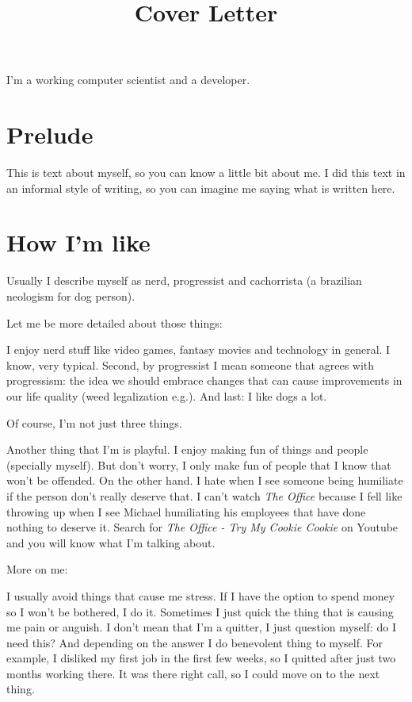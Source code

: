 \documentclass[11pt,a4paper,sans]{moderncv}
\title{Cover Letter}
\begin{document}
\makecvtitle %
I'm a working computer scientist and a developer.

\section{Prelude}
This is text about myself, so you can know a little bit about me.
I did this text in an informal style of writing, so you can imagine me saying what is written here.

\section{How I'm like}
Usually I describe myself as nerd, progressist and cachorrista (a brazilian neologism for dog person).

Let me be more detailed about those things:

I enjoy nerd stuff like video games, fantasy movies and technology in general.
I know, very typical.
Second, by progressist I mean someone that agrees with progressism: the idea we should embrace changes that can cause improvements in our life quality (weed legalization e.g.).
And last: I like dogs a lot.

\medskip

Of course, I'm not just three things.

\medskip

Another thing that I'm is playful.
I enjoy making fun of things and people (specially myself).
But don't worry, I only make fun of people that I know that won't be offended.
On the other hand. I hate when I see someone being humiliate if the person don't really deserve that.
I can't watch \textit{The Office} because I fell like throwing up when I see Michael humiliating his employees that have done nothing to deserve it.
Search for \textit{The Office - Try My Cookie Cookie} on Youtube and you will know what I'm talking about.

\medskip

More on me:

\medskip

I usually avoid things that cause me stress.
If I have the option to spend money so I won't be bothered, I do it.
Sometimes I just quick the thing that is causing me pain or anguish.
I don't mean that I'm a quitter, I just question myself: do I need this?
And depending on the answer I do benevolent thing to myself.
For example, I disliked my first job in the first few weeks, so I quitted after just two months working there.
It was there right call, so I could move on to the next thing.
\end{document}
